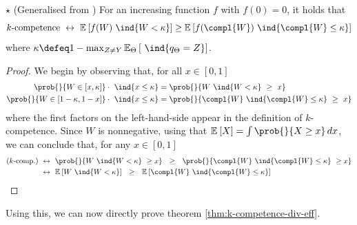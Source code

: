\documentclass[../main.tex]{subfiles}
\begin{document}
\begin{lemma} $\star$ (Generalised from \cite{theisen}) \label{thm:lemma-2} For an increasing function $f$ with $f(0)=0$, it holds that
$$
\text{$k$-competence}  ~\leftrightarrow~ \mathbb{E}_{}\left[ f(W) ~\ind{W < \kappa} \right] \geq \mathbb{E}_{}\left[ f(\compl{W}) ~\ind{\compl{W} \leq \kappa } \right]  
$$
where $ \kappa \defeq 1 - \max_{Z \not= Y} \mathbb{E}_{\Theta}\left[ ~\ind{q_{\Theta} = Z} \right]$.
\end{lemma}
\begin{proof}

We begin by observing that, for all $x \in [0,1]$
\begin{align*}
\prob{}{W \in [x, \kappa] } \cdot ~\ind{x \leq \kappa } &= \prob{}{W ~\ind{W < \kappa} ~ \geq ~ x} \\
\prob{}{W \in [1-\kappa,1-x]} \cdot ~\ind{x \leq \kappa} &= \prob{}{\compl{W} ~\ind{\compl{W} \leq \kappa } ~ \geq ~ x }
\end{align*}
where the first factors on the left-hand-side appear in the definition of $k$-competence.
Since $W$ is nonnegative, using that $\mathbb{E}_{}\left[ X \right] = \int \prob{}{X \geq x} \, dx$, we can conclude that, for any $x \in [0,1]$
\begin{align*}
\text{($k$-comp.)}  &~\leftrightarrow~  
\prob{}{W ~\ind{W < \kappa} ~ \geq x} 
~ ~ \geq ~ ~
\prob{}{\compl{W} ~\ind{\compl{W} \leq \kappa } ~ \geq x } \\
& ~\leftrightarrow~
\mathbb{E}_{}\left[ W ~\ind{W < \kappa} \right] ~ ~ \geq ~ ~ \mathbb{E}_{}\left[ \compl{W} ~\ind{\compl{W} \leq \kappa }  \right] 
\end{align*}

\end{proof}
Using this, we can now directly prove theorem \ref{thm:k-competence-div-eff}.
\end{document}
